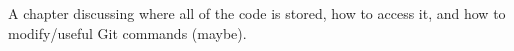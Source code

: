 A chapter discussing where all of the code is stored, how to access it, and how to modify/useful Git commands (maybe).